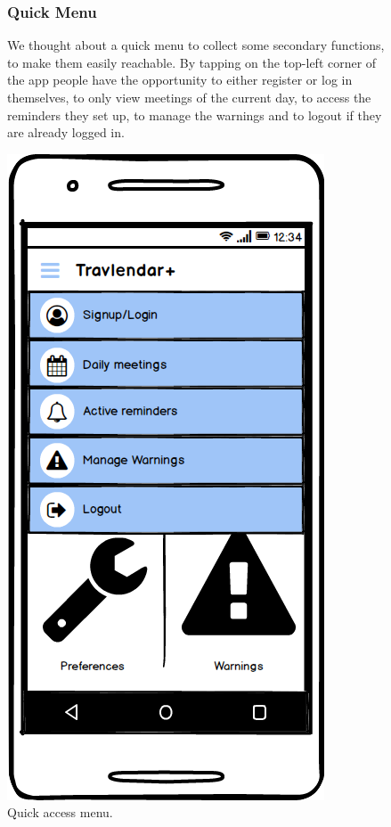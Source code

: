	\begin{figure}
			\begin{flushleft}
			\subsubsection{Quick Menu}
			We thought about a quick menu to collect some secondary functions, to make them easily reachable. By tapping on the top-left corner of the app people have the opportunity to either register or log in themselves, to only view meetings of the current day, to access the reminders they set up, to manage the warnings and to logout if they are already logged in.
		\end{flushleft}
	\centering
	\includegraphics[width=0.6\linewidth]{mockups/QuickMenu}
	\caption{Quick access menu.}
	\label{fig:quickmenu}
	\end{figure}
\clearpage


